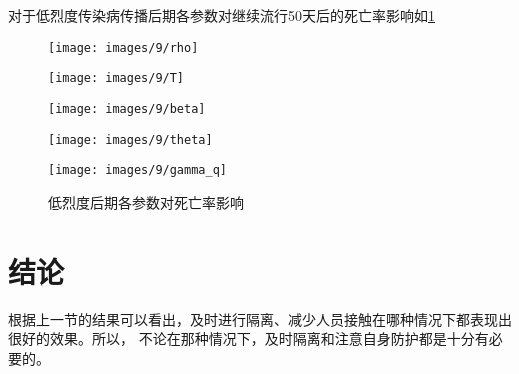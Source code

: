 \documentclass[withoutpreface,bwprint]{cumcmthesis}
\begin{document}
对于低烈度传染病传播后期各参数对继续流行50天后的死亡率影响如\cref{fig:14}
\begin{figure}[H]
    \centering
    \begin{minipage}[c]{0.3\textwidth}
        \centering
        \texttt{[image: images/9/rho]}
        \subcaption{$\rho$}
    \end{minipage}
    \begin{minipage}[c]{0.3\textwidth}
        \centering
        \texttt{[image: images/9/T]}
    \end{minipage}
    \begin{minipage}[c]{0.3\textwidth}
        \centering
        \texttt{[image: images/9/beta]}
        \subcaption{$\beta$}
    \end{minipage}

    \begin{minipage}[c]{0.3\textwidth}
        \centering
        \texttt{[image: images/9/theta]}
        \subcaption{$\theta$}
    \end{minipage}
    \begin{minipage}[c]{0.3\textwidth}
        \centering
        \texttt{[image: images/9/gamma\_q]}
    \end{minipage}
    \caption{低烈度后期各参数对死亡率影响}
    \label{fig:14}
    
\end{figure}


\section{结论}

根据上一节的结果可以看出，及时进行隔离、减少人员接触在哪种情况下都表现出很好的效果。所以，
不论在那种情况下，及时隔离和注意自身防护都是十分有必要的。
\end{document}
